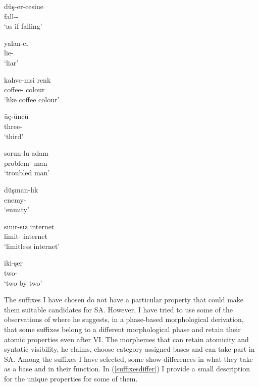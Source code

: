 \begin{exe}
  \begin{multicols}{2}
    \ex \label{derivationalsuffixes}
    \begin{xlist}
        \ex 
        \gll 
        düş-er-cesine \\ fall-{\Aor}-{\Der} \\
        \glt `as if falling'
        
        \ex 
        \gll 
        yalan-cı \\ lie-{\Der} \\ 
        \glt `liar'
        
        \ex 
        \gll 
        kahve-msi renk \\ coffee-{\Der} colour \\
        \glt `like coffee colour'

        \ex 
        \gll 
        üç-üncü \\ three-{\Der} \\
        \glt `third'
        
\columnbreak

        \ex 
        \gll 
        sorun-lu adam \\ problem-{\Der} man \\
        \glt `troubled man'
        
        \ex 
        \gll 
        düşman-lık \\ enemy-{\Der} \\
        \glt `enmity'
        
        \ex 
        \gll 
        sınır-sız internet \\ limit-{\Der} internet \\
        \glt `limitless internet'
        
        \ex 
        \gll 
        iki-şer \\ two-{\Der} \\
        \glt `two by two'
    \end{xlist}
    \end{multicols}
\end{exe}

The suffixes I have chosen do not have a particular property that could make them suitable candidates for SA. However, I have tried to use some of the observations of \cite{yoon2017lexical} where he suggests, in a phase-based morphological derivation, that some suffixes belong to a different morphological phase and retain their atomic properties even after VI. The morphemes that can retain atomicity and syntatic visibility, he claims, choose category assigned bases and can take part in SA. Among the suffixes I have selected, some show differences in what they take as a base and in their function. In (\ref{suffixesdiffer}) I provide a small description for the unique properties for some of them.

